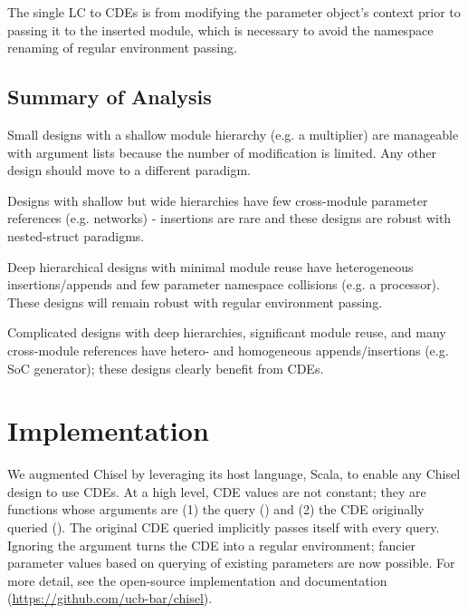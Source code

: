 The single LC to CDEs is from modifying the parameter object's context prior to passing it to the inserted module, which is necessary to avoid the namespace renaming of regular environment passing.

\subsection{Summary of Analysis}

Small designs with a shallow module hierarchy (e.g. a multiplier) are manageable with argument lists because the number of modification is limited. Any other design should move to a different paradigm.

Designs with shallow but wide hierarchies have few cross-module parameter references (e.g. networks) - insertions are rare and these designs are robust with nested-struct paradigms.

Deep hierarchical designs with minimal module reuse have heterogeneous insertions/appends and few parameter namespace collisions (e.g. a processor). These designs will remain robust with regular environment passing.

Complicated designs with deep hierarchies, significant module reuse, and many cross-module references have hetero- and homogeneous appends/insertions (e.g. SoC generator); these designs clearly benefit from CDEs.

\section{Implementation}
\label{sec:dse}

We augmented Chisel by leveraging its host language, Scala, to enable any Chisel design to use CDEs. At a high level, CDE values are not constant; they are functions whose arguments are (1) the query () and (2) the CDE originally queried (). The original CDE queried implicitly passes itself with every query. Ignoring the  argument turns the CDE into a regular environment; fancier parameter values based on querying  of existing parameters are now possible. For more detail, see the open-source implementation and documentation (\url{https://github.com/ucb-bar/chisel}).

